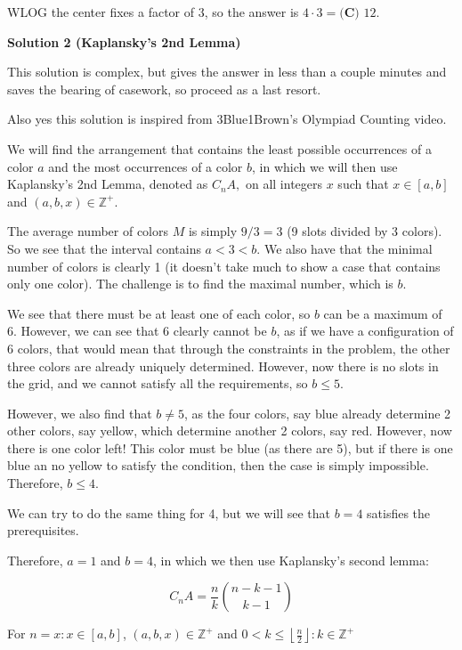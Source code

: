 \begin{enumerate}
 WLOG the center fixes a factor of $3$, so the answer is $4\cdot 3=\boxed{\textbf{(C) } 12}$.

 



\textbf{Solution 2 (Kaplansky's 2nd Lemma)}

This solution is complex, but gives the answer in less than a couple minutes and saves the bearing of casework, so proceed as a last resort.

 Also yes this solution is inspired from 3Blue1Brown's Olympiad Counting video.

 We will find the arrangement that contains the least possible occurrences of a color \( a \) and the most occurrences of a color \( b \), in which we will then use Kaplansky's 2nd Lemma, denoted as \( C_n A, \) on all integers \( x \) such that \( x \in [a,b] \) and \( (a,b,x) \in \mathbb{Z}^+ \).

 The average number of colors \( M \) is simply \( 9/3 = 3 \) (9 slots divided by 3 colors). So we see that the interval contains \( a < 3 < b \). We also have that the minimal number of colors is clearly 1 (it doesn't take much to show a case that contains only one color). The challenge is to find the maximal number, which is \( b \).

 We see that there must be at least one of each color, so \( b \) can be a maximum of 6. However, we can see that 6 clearly cannot be \( b \), as if we have a configuration of 6 colors, that would mean that through the constraints in the problem, the other three colors are already uniquely determined. However, now there is no slots in the grid, and we cannot satisfy all the requirements, so \( b \le 5 \).

 However, we also find that \( b \ne 5 \), as the four colors, say blue already determine 2 other colors, say yellow, which determine another 2 colors, say red. However, now there is one color left! This color must be blue (as there are 5), but if there is one blue an no yellow to satisfy the condition, then the case is simply impossible. Therefore, \( b \le 4 \).

 We can try to do the same thing for 4, but we will see that \( b=4 \) satisfies the prerequisites.

 Therefore, \( a=1 \) and \( b=4 \), in which we then use Kaplansky's second lemma:

 
 \[C_n A = \frac{n}{k} \binom{n-k-1}{k-1}\]

 For \( n=x : x \in [a,b] \), \( (a,b,x) \in \mathbb{Z}^+ \) and \( 0 < k \le \left\lfloor\frac{n}{2}\right\rfloor : k \in \mathbb{Z}^+ \)


\end{enumerate}
